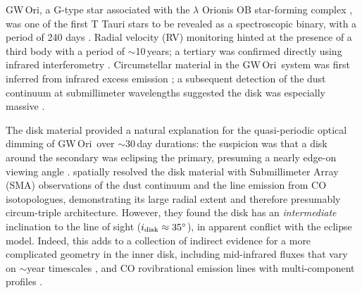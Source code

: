 \documentclass[twocolumn]{aastex61}
\newcommand{\todo}[1]{ \textcolor{red}{#1}}
\newcommand{\obj}{GW\,Ori}
\begin{document}
\obj, a G-type star associated with the $\lambda$ Orionis OB star-forming complex \citep{dolan00,dolan01,dolan02}, was one of the first T Tauri stars to be revealed as a spectroscopic binary, with a period of 240 days \citep{mathieu91}. Radial velocity (RV) monitoring hinted at the presence of a third body with a period of $\sim$10\,years; a tertiary was confirmed directly using infrared interferometry \citep{berger11}. 
Circumstellar material in the \obj\ system was first inferred from infrared excess emission \citep{mathieu91}; a subsequent detection of the dust continuum at submillimeter wavelengths suggested the disk was especially massive \citep[$M_{\rm disk} \gtrsim 0.1 M_\odot$;][]{mathieu95}. 

The disk material provided a natural explanation for the quasi-periodic optical dimming of \obj\ over $\sim$30\,day durations: the suspicion was that a disk around the secondary was eclipsing the primary, presuming a nearly edge-on viewing angle \citep{shevchenko92,shevchenko98}.
\citet{fang17} spatially resolved the disk material with Submillimeter Array (SMA) observations of the dust continuum and the line emission from CO isotopologues, demonstrating its large radial extent and therefore presumably circum-triple architecture.  However, they found the disk has an \emph{intermediate} inclination to the line of sight ($i_\mathrm{disk} \approx 35\mbox{$^\circ$}$), in apparent conflict with the eclipse model. Indeed, this adds to a collection of indirect evidence for a more complicated geometry in the inner disk, including mid-infrared fluxes that vary on $\sim$year timescales \citep{fang14}, and CO rovibrational emission lines with multi-component profiles \citep[which a complicated geometry and/or temperature structure in the inner disk;][]{najita03}.

\end{document}
